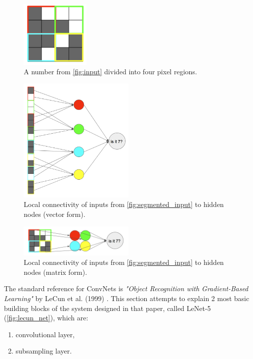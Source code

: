 \documentclass[11pt, a4paper]{article}
\begin{document}
\begin{figure}[h]
\includegraphics[width=0.3\textwidth]{segmented_input}
\centering
\caption[Podzielenie obrazka na 4 regiony pikseli]{A number from \autoref{fig:input} divided into four pixel regions.}
\label{fig:segmented_input}
\end{figure}

\begin{figure}[h]
\includegraphics[width=0.5\textwidth]{cnn_column}
\centering
\caption[Lokalna łączność wejść konwolucyjnej sieci neuronowej (forma wektora)]{Local connectivity of inputs from \autoref{fig:segmented_input} to hidden nodes (vector form).}
\label{fig:cnn_column}
\end{figure}

\begin{figure}[h]
\includegraphics[width=0.5\textwidth]{cnn_spacial}
\centering
\caption[Lokalna łączność wejść konwolucyjnej sieci neuronowej (forma matrycy)]{Local connectivity of inputs from \autoref{fig:segmented_input} to hidden nodes (matrix form).}
\label{fig:cnn_spacial}
\end{figure}

The standard reference for ConvNets is \textit{"Object Recognition with Gradient-Based Learning"} by LeCun et al. (1999) \cite{lecun_object}. This section attempts to explain 2 most basic building blocks of the system designed in that paper, called LeNet-5 (\autoref{fig:lecun_net}), which are:
\begin{enumerate}[1)]
\item convolutional layer,
\item subsampling layer.
\end{enumerate}
\end{document}
